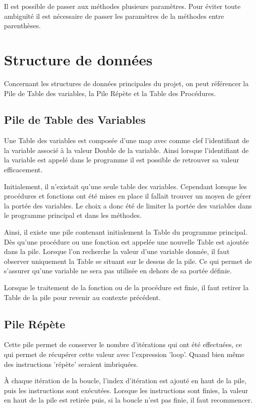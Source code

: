 \documentclass[a4paper,11pt]{article}
\begin{document}
Il est possible de passer aux méthodes plusieurs paramètres. Pour éviter toute ambiguïté il est nécessaire de passer les paramètres de la méthodes entre parenthèses.  




\section{Structure de données}
Concernant les structures de données principales du projet, on peut référencer la Pile de Table des variables, la Pile Répète et la Table des Procédures.

\subsection{Pile de Table des Variables}
Une Table des variables est composée d'une map avec comme clef l'identifiant de la variable associé à la valeur Double de la variable. Ainsi lorsque l'identifiant de la variable est appelé dans le programme il est possible de retrouver sa valeur efficacement.

Initialement, il n'existait qu'une seule table des variables. Cependant lorsque les procédures et fonctions ont été mises en place il fallait trouver un moyen de gérer la portée des variables.
Le choix a donc été de limiter la portée des variables dans le programme principal et dans les méthodes. 

Ainsi, il existe une pile contenant initialement la Table du programme principal. Dès qu'une procédure ou une fonction est appelée une nouvelle Table est ajoutée dans la pile.
Lorsque l'on recherche la valeur d'une variable donnée, il faut observer uniquement la Table se situant sur le dessus de la pile. Ce qui permet de s'assurer qu'une variable ne sera pas utilisée en dehors de sa portée définie.

Lorsque le traitement de la fonction ou de la procédure est finie, il faut retirer la Table de la pile pour revenir au contexte précédent.


\subsection{Pile Répète}
Cette pile permet de conserver le nombre d'itérations qui ont été effectuées, ce qui permet de récupérer cette valeur avec l'expression 'loop'. Quand bien même des instructions 'répète' seraient imbriquées.

À chaque itération de la boucle, l'index d'itération est ajouté en haut de la pile, puis les instructions sont exécutées. Lorsque les instructions sont finies, la valeur en haut de la pile est retirée puis, si la boucle n'est pas finie, il faut recommencer. 
\end{document}
